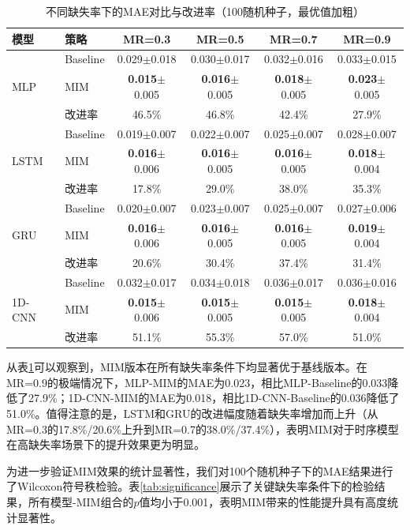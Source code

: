 \documentclass[10pt,a4paper]{ctexart}
\begin{document}
\begin{table}[H]
\centering
\small
\caption{不同缺失率下的MAE对比与改进率（100随机种子，最优值加粗）}
\label{tab:full_results}
\begin{tabular}{@{}llcccc@{}}
\toprule
\textbf{模型} & \textbf{策略} & \textbf{MR=0.3} & \textbf{MR=0.5} & \textbf{MR=0.7} & \textbf{MR=0.9} \\
\midrule
\multirow{3}{*}{MLP} 
& Baseline & 0.029$\pm$0.018 & 0.030$\pm$0.017 & 0.032$\pm$0.016 & 0.033$\pm$0.015 \\
& MIM & \textbf{0.015}$\pm$0.005 & \textbf{0.016}$\pm$0.005 & \textbf{0.018}$\pm$0.005 & \textbf{0.023}$\pm$0.005 \\
& 改进率 & 46.5\% & 46.8\% & 42.4\% & 27.9\% \\
\midrule
\multirow{3}{*}{LSTM} 
& Baseline & 0.019$\pm$0.007 & 0.022$\pm$0.007 & 0.025$\pm$0.007 & 0.028$\pm$0.007 \\
& MIM & \textbf{0.016}$\pm$0.006 & \textbf{0.016}$\pm$0.005 & \textbf{0.016}$\pm$0.005 & \textbf{0.018}$\pm$0.004 \\
& 改进率 & 17.8\% & 29.0\% & 38.0\% & 35.3\% \\
\midrule
\multirow{3}{*}{GRU} 
& Baseline & 0.020$\pm$0.007 & 0.023$\pm$0.007 & 0.025$\pm$0.007 & 0.027$\pm$0.006 \\
& MIM & \textbf{0.016}$\pm$0.006 & \textbf{0.016}$\pm$0.005 & \textbf{0.016}$\pm$0.005 & \textbf{0.019}$\pm$0.004 \\
& 改进率 & 20.6\% & 30.4\% & 37.4\% & 31.4\% \\
\midrule
\multirow{3}{*}{1D-CNN} 
& Baseline & 0.032$\pm$0.017 & 0.034$\pm$0.018 & 0.036$\pm$0.017 & 0.036$\pm$0.016 \\
& MIM & \textbf{0.015}$\pm$0.006 & \textbf{0.015}$\pm$0.005 & \textbf{0.015}$\pm$0.005 & \textbf{0.018}$\pm$0.004 \\
& 改进率 & 51.1\% & 55.3\% & 57.0\% & 51.0\% \\
\bottomrule
\end{tabular}
\end{table}

从表\ref{tab:full_results}可以观察到，MIM版本在所有缺失率条件下均显著优于基线版本。在MR=0.9的极端情况下，MLP-MIM的MAE为0.023，相比MLP-Baseline的0.033降低了27.9\%；1D-CNN-MIM的MAE为0.018，相比1D-CNN-Baseline的0.036降低了51.0\%。值得注意的是，LSTM和GRU的改进幅度随着缺失率增加而上升（从MR=0.3的17.8\%/20.6\%上升到MR=0.7的38.0\%/37.4\%），表明MIM对于时序模型在高缺失率场景下的提升效果更为明显。

为进一步验证MIM效果的统计显著性，我们对100个随机种子下的MAE结果进行了Wilcoxon符号秩检验。表\ref{tab:significance}展示了关键缺失率条件下的检验结果，所有模型-MIM组合的$p$值均小于0.001，表明MIM带来的性能提升具有高度统计显著性。
\end{document}
